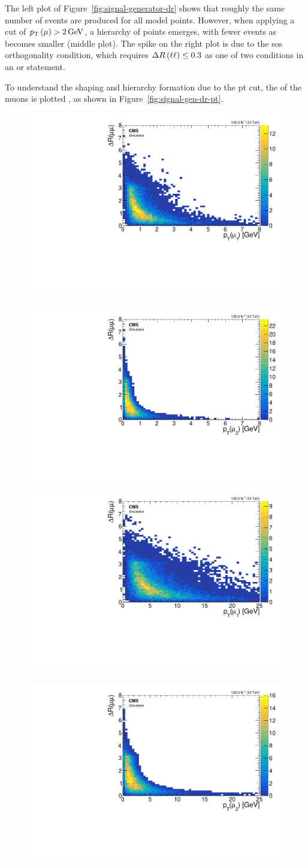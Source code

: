 The left plot of Figure~\ref{fig:signal-generator-dr} shows that roughly the same number of events are produced for all \dm model points. However, when applying a cut of $p_{\mathrm{T}}\left(\mu\right)>2\,\text{Ge\hspace{-.08em}V}$, a hierarchy of \dm points emerges, with fewer events as \dm becomes smaller (middle plot). The spike on the right plot is due to the \gls{sos} orthogonality condition, which requires $\Delta R\left(\ell\ell\right)\leq 0.3$ as one of two conditions in an or statement.

To understand the shaping and hierarchy formation due to the \gls{pt} cut, the \pt of the muons is plotted \vs \drll, as shown in Figure~\ref{fig:signal-gen-dr-pt}.

\begin{figure}[!htb]
\centering
\includegraphics[width=0.48\linewidth]{plots/signal_muons_gen_delta_r_vs_pt/none_gen_delta_r_vs_pt_1.pdf} \,
\includegraphics[width=0.48\linewidth]{plots/signal_muons_gen_delta_r_vs_pt/none_gen_delta_r_vs_pt_2.pdf}  \\
\includegraphics[width=0.48\linewidth]{plots/signal_muons_gen_delta_r_vs_pt_dm5/none_gen_delta_r_vs_pt_1.pdf} \,
\includegraphics[width=0.48\linewidth]{plots/signal_muons_gen_delta_r_vs_pt_dm5/none_gen_delta_r_vs_pt_2.pdf}  \\

\end{figure}
